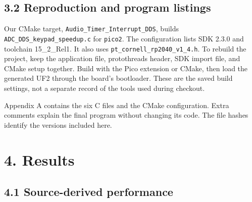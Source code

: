 \documentclass[11pt,letterpaper]{article}
\begin{document}
\subsection*{3.2 Reproduction and program listings}

Our CMake target, \texttt{Audio\_Timer\_Interrupt\_DDS}, builds \texttt{ADC\_DDS\_keypad\_speedup.c} for \texttt{pico2}. The configuration lists SDK 2.3.0 and toolchain 15\_2\_Rel1. It also uses \texttt{pt\_cornell\_rp2040\_v1\_4.h}. To rebuild the project, keep the application file, protothreads header, SDK import file, and CMake setup together. Build with the Pico extension or CMake, then load the generated UF2 through the board's bootloader. These are the saved build settings, not a separate record of the tools used during checkout.

Appendix A contains the six C files and the CMake configuration. Extra comments explain the final program without changing its code. The file hashes identify the versions included here.

\section*{4. Results}

\subsection*{4.1 Source-derived performance}
\end{document}
